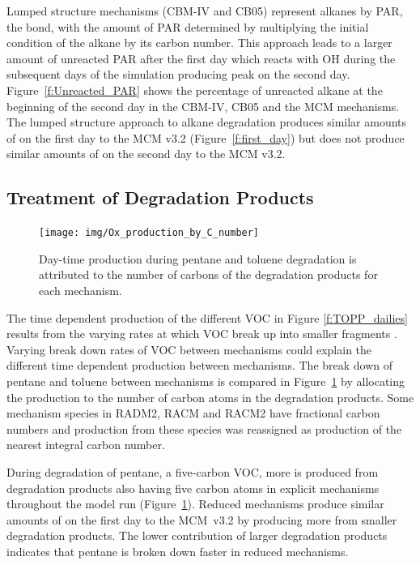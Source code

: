 Lumped structure mechanisms (CBM-IV and CB05) represent alkanes by PAR, the  bond, with the amount of PAR determined by multiplying the initial condition of the alkane by its carbon number.
This approach leads to a larger amount of unreacted PAR after the first day which reacts with OH during the subsequent days of the simulation producing peak  on the second day.
\mbox{Figure \ref{f:Unreacted_PAR}} shows the percentage of unreacted alkane at the beginning of the second day in the CBM-IV, CB05 and the MCM mechanisms.
The lumped structure approach to alkane degradation produces similar amounts of  on the first day to the MCM v3.2 (\mbox{Figure \ref{f:first_day}}) but does not produce similar amounts of  on the second day to the MCM v3.2.
%
\subsection{Treatment of Degradation Products} \label{ss:products} 
%
\begin{figure}
    \centering
    \texttt{[image: img/Ox\_production\_by\_C\_number]}
    \vspace{0mm}
    \caption{Day-time  production during pentane and toluene degradation is attributed to the number of carbons of the degradation products for each mechanism.}
    \vspace{-4mm}
    \label{f:carbon}
\end{figure}
%
The time dependent  production of the different VOC in Figure \ref{f:TOPP_dailies} results from the varying rates at which VOC break up into smaller fragments \citep{Butler:2011}.
Varying break down rates of VOC between mechanisms could explain the different time dependent  production between mechanisms.
The break down of pentane and toluene between mechanisms is compared in \mbox{Figure \ref{f:carbon}} by allocating the  production to the number of carbon atoms in the degradation products.
Some mechanism species in RADM2, RACM and RACM2 have fractional carbon numbers \citep{Stockwell:1990, Stockwell:1997, Goliff:2013} and  production from these species was reassigned as  production of the nearest integral carbon number.  

During degradation of pentane, a five-carbon VOC, more  is produced from degradation products also having five carbon atoms in explicit mechanisms throughout the model run \mbox{(Figure \ref{f:carbon}).}
Reduced mechanisms produce similar amounts of  on the first day to the \mbox{MCM v3.2} by producing more  from smaller degradation products.
The lower contribution of larger degradation products indicates that pentane is broken down faster in reduced mechanisms.


